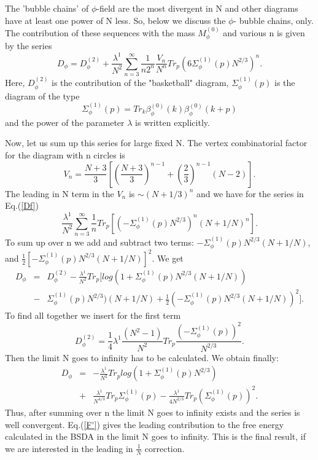 \documentclass[a4paper,12pt]{article}
\begin{document}
The 'bubble chains' of $\phi$-field are the most divergent in N and
other diagrams have at least one power of N less. So, below we discuss
the $\phi$- bubble chains, only. The contribution of these sequences
with the mass $M_{\phi}^{(0)}$ and various n is given by the series
\begin{equation} \label{Df}
D_{\phi} = D_{\phi}^{(2)} + \frac{\lambda^1}{N^2} \sum_{n=3}^{\infty}
\frac{1}{n 2^n}\frac{V_n}{N^n}Tr_p (6 \Sigma^{(1)}_{\phi}(p) N^{2/3})^n.
\end{equation} 
Here, $D_{\phi}^{(2)}$ is the contribution of the "basketball"
diagram, $\Sigma^{(1)}_{\phi}(p)$ is the diagram of the type
\begin{equation} \label{b}
\Sigma^{(1)}_{\phi}(p) = Tr_k \beta^{(0)}_{\phi}(k) \beta^{(0)}_{\phi}(k+p) 
\end{equation}
and the power of the parameter $\lambda$ is written explicitly.

Now, let us sum up this series for large fixed N. The vertex
combinatorial factor for the diagram with n circles is \cite{prd}
\begin{equation} \label{Vn}
V_n =  \frac{N+3}{3} [(\frac{N+3}{3})^{n-1} + (\frac{2}{3})^{n-1} (N - 2)].
\end{equation}
The leading in N term in the $V_{n}$ is $\sim (N+1/3)^n$ and we have
for the series in Eq.(\ref{Df})
\begin{equation}
 \frac{\lambda^{1}}{N^2} \sum_{n=3}^{\infty}\frac{1}{n}Tr_p [(-
 \Sigma^{(1)}_{\phi}(p) N^{2/3})^n (N+1/N)^n].
\end{equation}
To sum up over n we add and subtract two terms: $-
\Sigma^{(1)}_{\phi}(p) N^{2/3}(N+1/N)$, and $\frac{1}{2}[-
\Sigma^{(1)}_{\phi}(p) N^{2/3} (N+1/N)]^2$.  We get
\begin{eqnarray}
D_{\phi} &=& D_{\phi}^{(2)} - \frac{\lambda^1}{N^2} Tr_p [log(1 +
\Sigma^{(1)}_{\phi}(p) N^{2/3}(N+1/N) ) \\ \nonumber &-&
\Sigma^{(1)}_{\phi}(p) N^{2/3}) (N+1/N) + \frac{1}{2}(-
\Sigma^{(1)}_{\phi}(p) N^{2/3} (N+1/N))^2].
\end{eqnarray}
To find all together we insert for the first term
\begin{equation}
D_{\phi}^{(2)} = \frac{1}{4} \lambda^1 \frac{(N^2 - 1)}{N^2}Tr_p
\frac{(- \Sigma^{(1)}_{\phi}(p))^2}{ N^{2/3}}.
\end{equation}
Then the limit N goes to infinity has to be calculated. We obtain
finally:
\begin{eqnarray} \label{F'}
D_{\phi} &=& - \frac{\lambda^1}{N^2}Tr_p log(1 +
\Sigma^{(1)}_{\phi}(p) N^{2/3})\\\nonumber &+&
\frac{\lambda^1}{N^{4/3}}Tr_p \Sigma^{(1)}_{\phi}(p) -
\frac{\lambda^1}{4 N^{2/3}}Tr_p (\Sigma^{(1)}_{\phi}(p))^2.
\end{eqnarray}
Thus, after summing over n the limit N goes to infinity exists and the
series is well convergent.  Eq.(\ref{F'}) gives the leading
contribution to the free energy calculated in the BSDA in the limit N
goes to infinity. This is the final result, if we are interested in
the leading in $\frac{1}{N}$ correction.
\end{document}
